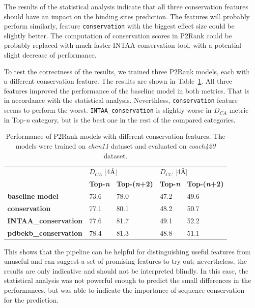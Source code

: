 The results of the statistical analysis indicate that all three conservation features should have an impact on the binding sites prediction. The features will probably perform similarly, feature \texttt{conservation} with the biggest effect size could be slightly better. The computation of conservation scores in P2Rank could be probably replaced with much faster INTAA-conservation tool, with a potential slight decrease of performance.

To test the correctness of the results, we trained three P2Rank models, each with a different conservation feature. The results are shown in Table~\ref{tab:P2Rankconservation}. All three features improved the performance of the baseline model in both metrics. That is in accordance with the statistical analysis. Neverthless, \texttt{conservation} feature seems to perform the worst. \texttt{INTAA\_conservation} is slightly worse in $D_{CA}$ metric in Top-\textit{n} category, but is the best one in the rest of the compared categories.  


\begin{table}[!h] \centering
\begin{tabular}{lllll}
\hline
\textbf{}                     & \multicolumn{2}{l}{$D_{CA}$ {[}4{\AA}{]}}   & \multicolumn{2}{l}{$D_{CC}$ {[}4{\AA}{]}}   \\
                              & \textbf{Top-\textit{n}} & \textbf{Top-(\textit{n}+2)} & \textbf{Top-\textit{n}} & \textbf{Top-(\textit{n}+2)} \\ \hline
\textbf{baseline model}        & 73.6           & 78.0                 & 47.2           & 49.6               \\
\textbf{conservation}         & 77.1           & 80.1               & 48.2           & 50.7               \\
\textbf{INTAA\_conservation}  & 77.6           & 81.7               & 49.1           & 52.2               \\
\textbf{pdbekb\_conservation} & 78.4           & 81.3               & 48.8           & 51.1               \\ \hline
\end{tabular}
\label{tab:P2Rankconservation}
\caption[Performance of P2Rank models with different conservation features]{Performance of P2Rank models with different conservation features. The models were trained on \textit{chen11} dataset and evaluated on \textit{coach420} dataset.}
\end{table}

This shows that the pipeline can be helpful for distinguishing useful features from unuseful and can suggest a set of promising features to try out; nevertheless, the results are only indicative and should not be interpreted blindly. In this case, the statistical analysis was not powerful enough to predict the small differences in the performances, but was able to indicate the importance of sequence conservation for the prediction.

